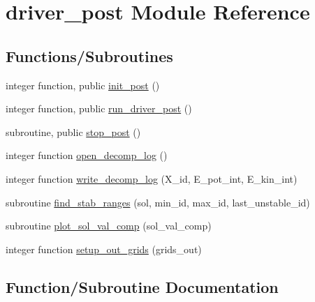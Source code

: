 \hypertarget{namespacedriver__post}{}\section{driver\+\_\+post Module Reference}
\label{namespacedriver__post}
\subsection*{Functions/\+Subroutines}
\begin{DoxyCompactItemize}
\item 
integer function, public \hyperlink{namespacedriver__post_af527706d4e696d4e507443d2f74194ef}{init\+\_\+post} ()
\item 
integer function, public \hyperlink{namespacedriver__post_a33b3c6f9018a0ddc92dce77394b8ab37}{run\+\_\+driver\+\_\+post} ()
\item 
subroutine, public \hyperlink{namespacedriver__post_a71f9fb1935222111e1c7cfc15c5d0269}{stop\+\_\+post} ()
\item 
integer function \hyperlink{namespacedriver__post_a5d76f87f131e21b4d74fd5f4a7bbbd6b}{open\+\_\+decomp\+\_\+log} ()
\item 
integer function \hyperlink{namespacedriver__post_a4981c6c0e63b862c92ba240f43e22e77}{write\+\_\+decomp\+\_\+log} (X\+\_\+id, E\+\_\+pot\+\_\+int, E\+\_\+kin\+\_\+int)
\item 
subroutine \hyperlink{namespacedriver__post_a51ecad1032e415d2a8e6e5b97d2c7e09}{find\+\_\+stab\+\_\+ranges} (sol, min\+\_\+id, max\+\_\+id, last\+\_\+unstable\+\_\+id)
\item 
subroutine \hyperlink{namespacedriver__post_af9ce961d2d6825b767a93fdbe8806a1c}{plot\+\_\+sol\+\_\+val\+\_\+comp} (sol\+\_\+val\+\_\+comp)
\item 
integer function \hyperlink{namespacedriver__post_aba7a645f4dd2e08db109cefc6ce0df86}{setup\+\_\+out\+\_\+grids} (grids\+\_\+out)
\end{DoxyCompactItemize}


\subsection{Function/\+Subroutine Documentation}
\mbox{\label{namespacedriver__post_a51ecad1032e415d2a8e6e5b97d2c7e09}} 
